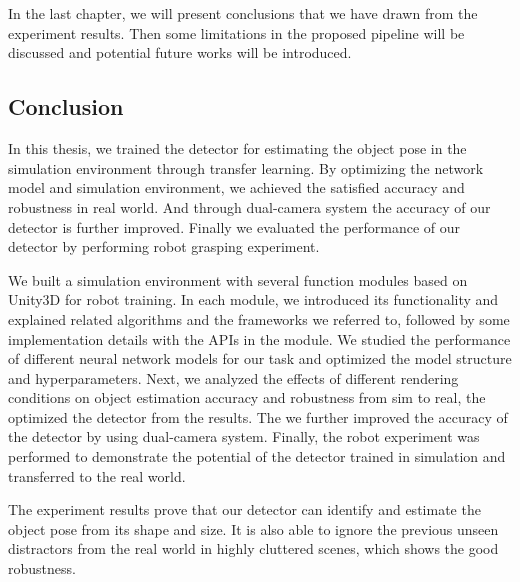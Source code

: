 \chapter{}
\label{sec:results}
In the last chapter, we will present conclusions that we have drawn from the experiment results. Then some limitations in the proposed pipeline will be discussed and potential future works will be introduced.

\section{Conclusion}
In this thesis, we trained the detector for estimating the object pose in the simulation environment through transfer learning. By optimizing the network model and simulation environment, we achieved the satisfied accuracy and robustness in real world. And through dual-camera system the accuracy of our detector is further improved. Finally we evaluated the performance of our detector by performing robot grasping experiment.

We built a simulation environment with several function modules based on Unity3D for robot training. In each module, we introduced its functionality and explained related algorithms and the frameworks we referred to, followed by some implementation details with the APIs in the module. We studied the performance of different neural network models for our task and optimized the model structure and hyperparameters. Next, we analyzed the effects of different rendering conditions on object estimation accuracy and robustness from sim to real, the optimized the detector from the results. The we further improved the accuracy of the detector by using dual-camera system. Finally, the robot experiment was performed to demonstrate the potential of the detector trained in simulation and transferred to the real world.

The experiment results prove that our detector can identify and estimate the object pose from its shape and size. It is also able to ignore the previous unseen distractors from the real world in highly cluttered scenes, which shows the good robustness.

